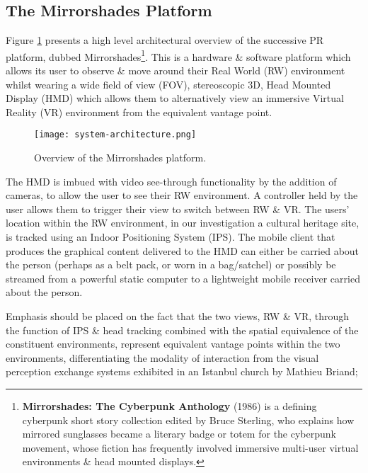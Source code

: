\subsection{The Mirrorshades Platform}

Figure \ref{systemarchitecture} presents a high level architectural overview of the successive PR platform, dubbed Mirrorshades\footnote{\textbf{Mirrorshades: The Cyberpunk Anthology} (1986) is a defining cyberpunk short story collection edited by Bruce Sterling, who explains how mirrored sunglasses became a literary badge or totem for the cyberpunk movement, whose fiction has frequently involved immersive multi-user virtual environments \& head mounted displays.}. This is a hardware \& software platform which allows its user to observe \& move around their Real World (RW) environment whilst wearing a wide field of view (FOV), stereoscopic 3D, Head Mounted Display (HMD) which allows them to alternatively view an immersive Virtual Reality (VR) environment from the equivalent vantage point.

\begin{figure}[h]
	\begin{center}
		\texttt{[image: system-architecture.png]}
		\caption{Overview of the Mirrorshades platform.}
		\label{systemarchitecture}
	\end{center}
\end{figure}

The HMD is imbued with video see-through functionality by the addition of cameras, to allow the user to see their RW environment. A controller held by the user allows them to trigger their view to switch between RW \& VR. The users' location within the RW environment, in our investigation a cultural heritage site, is tracked using an Indoor Positioning System (IPS). The mobile client that produces the graphical content delivered to the HMD can either be carried about the person (perhaps as a belt pack, or worn in a bag/satchel) or possibly be streamed from a powerful static computer to a lightweight mobile receiver carried about the person.

Emphasis should be placed on the fact that the two views, RW \& VR, through the function of IPS \& head tracking combined with the spatial equivalence of the constituent environments, represent equivalent vantage points within the two environments, differentiating the modality of interaction from the visual perception exchange systems exhibited in an Istanbul church by Mathieu Briand;

